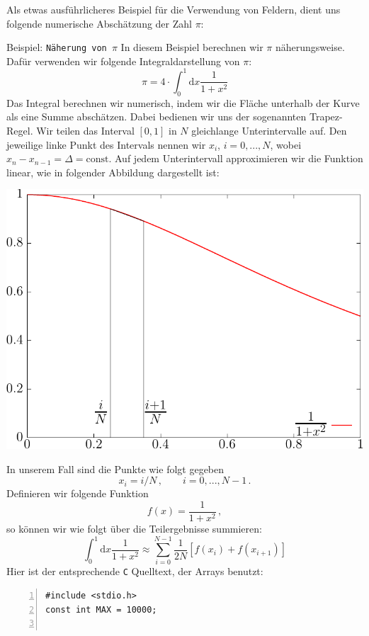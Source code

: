 Als etwas ausführlicheres Beispiel für die Verwendung von Feldern, dient uns folgende numerische Abschätzung der Zahl $\pi$:
\begin{myexampleprogram}{Beispiel: \texttt{Näherung von $\pi$}}
  In diesem Beispiel berechnen wir $\pi$ näherungsweise.
  Dafür verwenden wir folgende Integraldarstellung von $\pi$:
  \begin{equation}
    \pi=4\cdot \int_{0}^{1} \mathrm{d}x \dfrac{1}{1+x^2}
  \end{equation}
  Das Integral berechnen wir numerisch, indem wir die Fläche unterhalb der Kurve als eine Summe abschätzen.
  Dabei bedienen wir uns der sogenannten Trapez-Regel.
  Wir teilen das Interval $[0,1]$ in $N$ gleichlange Unterintervalle auf.
  Den jeweilige linke Punkt des Intervals nennen wir $x_i$, $i=0,...,N$, wobei $x_n-x_{n-1}=\Delta=\mathrm{const}$.
  Auf jedem Unterintervall approximieren wir die Funktion linear, wie in folgender Abbildung dargestellt ist:
  \begin{center}
    \includegraphics[width=.6\linewidth]{trapez1}
  \end{center}
  In unserem Fall sind die Punkte wie folgt gegeben
  \begin{displaymath}
    x_i = i/N\,,\qquad i = 0, ..., N-1\,.
  \end{displaymath}
  Definieren wir folgende Funktion
  \[
  f(x) = \frac{1}{1+x^2}\,,
  \]
  so können wir wie folgt über die Teilergebnisse summieren:
  \begin{equation}
    \int_{0}^{1} \mathrm{d}x \dfrac{1}{1+x^2}\approx \sum_{i=0}^{N-1}\frac{1}{2N}[f(x_i)+f(x_{i+1})]
  \end{equation}
  Hier ist der entsprechende \texttt{C} Quelltext, der Arrays benutzt:
\begin{lstlisting}[numbers=left]
#include <stdio.h>
const int MAX = 10000;


\end{lstlisting}
\end{myexampleprogram}
